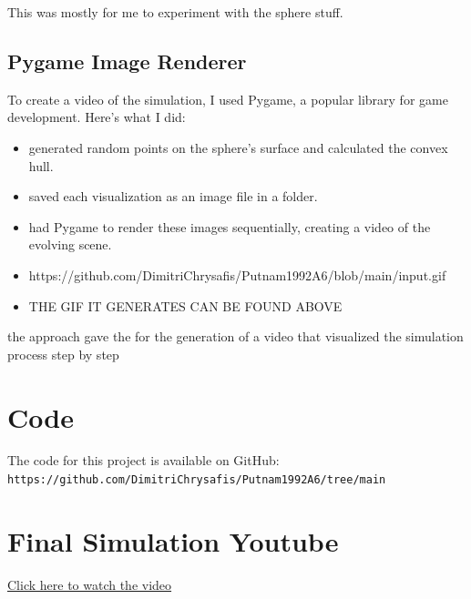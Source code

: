 \documentclass{article}
\begin{document}
This was mostly for me to experiment with the sphere stuff. 

\subsection{Pygame Image Renderer}
To create a video of the simulation, I used Pygame, a popular library for game development. Here's what I did:

\begin{itemize}
    \item generated random points on the sphere's surface and calculated the convex hull.
    \item saved each visualization as an image file in a folder.
    \item had Pygame to render these images sequentially, creating a video of the evolving scene.
    \item https://github.com/DimitriChrysafis/Putnam1992A6/blob/main/input.gif
    \item THE GIF IT GENERATES CAN BE FOUND ABOVE 
\end{itemize}

the approach gave the for the generation of a video that visualized the simulation process step by step


\section{Code}
The code for this project is available on GitHub: \texttt{https://github.com/DimitriChrysafis/Putnam1992A6/tree/main}

\section{Final Simulation Youtube}
\href{https://www.youtube.com/watch?v=JD38GMMxUhc}{Click here to watch the video}
\end{document}

